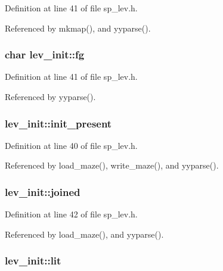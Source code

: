 Definition at line 41 of file sp\+\_\+lev.\+h.



Referenced by mkmap(), and yyparse().

\hypertarget{structlev__init_af05a7a24000bcbe833283f9f64e4f96f}{
\subsubsection[{fg}]{\setlength{\rightskip}{0pt plus 5cm}char lev\+\_\+init\+::fg}}\label{structlev__init_af05a7a24000bcbe833283f9f64e4f96f}


Definition at line 41 of file sp\+\_\+lev.\+h.



Referenced by yyparse().

\hypertarget{structlev__init_a3f0200a1efa4d4f3f16260524839036e}{
\subsubsection[{init\+\_\+present}]{ lev\+\_\+init\+::init\+\_\+present}}\label{structlev__init_a3f0200a1efa4d4f3f16260524839036e}


Definition at line 40 of file sp\+\_\+lev.\+h.



Referenced by load\+\_\+maze(), write\+\_\+maze(), and yyparse().

\hypertarget{structlev__init_af7653a4a64cf753edc423d2ea2734a8d}{
\subsubsection[{joined}]{ lev\+\_\+init\+::joined}}\label{structlev__init_af7653a4a64cf753edc423d2ea2734a8d}


Definition at line 42 of file sp\+\_\+lev.\+h.



Referenced by load\+\_\+maze(), and yyparse().

\hypertarget{structlev__init_a9b5482cd068d4e4c5c2a1277487cea9a}{
\subsubsection[{lit}]{ lev\+\_\+init\+::lit}}\label{structlev__init_a9b5482cd068d4e4c5c2a1277487cea9a}


